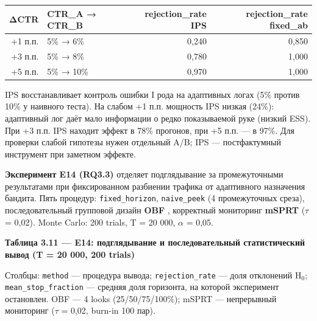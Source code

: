 \begingroup\footnotesize\setlength{\tabcolsep}{4pt}
\begin{xltabular}{\linewidth}{@{}rlrr@{}}
\toprule\noalign{}
ΔCTR & CTR\_A → CTR\_B & rejection\_rate IPS & rejection\_rate fixed\_ab \\
\midrule\noalign{}
\endhead
\bottomrule\noalign{}
\endlastfoot
+1 п.п. & 5\% → 6\% & 0,240 & 0,850 \\
+3 п.п. & 5\% → 8\% & 0,780 & 1,000 \\
+5 п.п. & 5\% → 10\% & 0,970 & 1,000 \\
\end{xltabular}
\endgroup

IPS восстанавливает контроль ошибки I рода на адаптивных логах (5\% против 10\% у наивного теста). На слабом +1 п.п. мощность IPS низкая (24\%): адаптивный лог даёт мало информации о редко показываемой руке (низкий ESS). При +3 п.п. IPS находит эффект в 78\% прогонов, при +5 п.п. --- в 97\%. Для проверки слабой гипотезы нужен отдельный A/B; IPS --- постфактумный инструмент при заметном эффекте.

\textbf{Эксперимент E14 (RQ3.3)} отделяет подглядывание за промежуточными результатами при фиксированном разбиении трафика от адаптивного назначения бандита. Пять процедур: \texttt{fixed\_horizon}, \texttt{naive\_peek} (4 промежуточных среза), последовательный групповой дизайн \textbf{OBF} \cite{ref33}, корректный мониторинг \textbf{mSPRT} \cite{ref19} ($\tau$ = 0,02). Monte Carlo: 200 trials, T = 20 000, $\alpha$ = 0,05.

\textbf{Таблица 3.11 --- E14: подглядывание и последовательный статистический вывод (T = 20 000, 200 trials)}

Столбцы: \texttt{method} --- процедура вывода; \texttt{rejection\_rate} --- доля отклонений H$_0$; \texttt{mean\_stop\_fraction} --- средняя доля горизонта, на которой эксперимент остановлен. OBF --- 4 looks (25/50/75/100\%); mSPRT --- непрерывный мониторинг ($\tau$ = 0,02, burn-in 100 пар).

